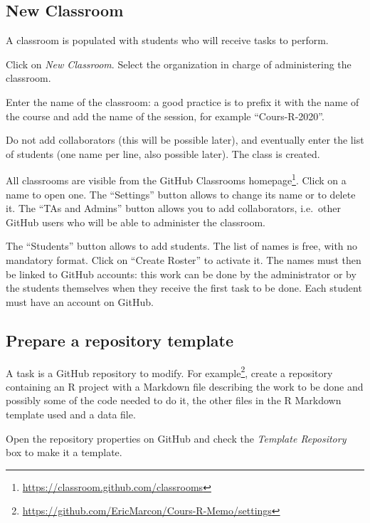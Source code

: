 \documentclass[
  12pt,
  american,
  a4paper,
  extrafontsizes,onecolumn,openright
  ]{memoir}
\newlength{\rf}
\begin{document}
\hypertarget{new-classroom}{%
\subsection{New Classroom}\label{new-classroom}}

A classroom is populated with students who will receive tasks to perform.

Click on \emph{New Classroom}.
Select the organization in charge of administering the classroom.

Enter the name of the classroom: a good practice is to prefix it with the name of the course and add the name of the session, for example \enquote{Cours-R-2020}.

Do not add collaborators (this will be possible later), and eventually enter the list of students (one name per line, also possible later).
The class is created.

All classrooms are visible from the GitHub Classrooms homepage\footnote{\url{https://classroom.github.com/classrooms}}.
Click on a name to open one.
The \enquote{Settings} button allows to change its name or to delete it.
The \enquote{TAs and Admins} button allows you to add collaborators, i.e.~other GitHub users who will be able to administer the classroom.

The \enquote{Students} button allows to add students.
The list of names is free, with no mandatory format.
Click on \enquote{Create Roster} to activate it.
The names must then be linked to GitHub accounts: this work can be done by the administrator or by the students themselves when they receive the first task to be done.
Each student must have an account on GitHub.

\hypertarget{prepare-a-repository-template}{%
\subsection{Prepare a repository template}\label{prepare-a-repository-template}}

A task is a GitHub repository to modify.
For example\footnote{\url{https://github.com/EricMarcon/Cours-R-Memo/settings}}, create a repository containing an R project with a Markdown file describing the work to be done and possibly some of the code needed to do it, the other files in the R Markdown template used and a data file.

Open the repository properties on GitHub and check the \emph{Template Repository} box to make it a template.
\end{document}
